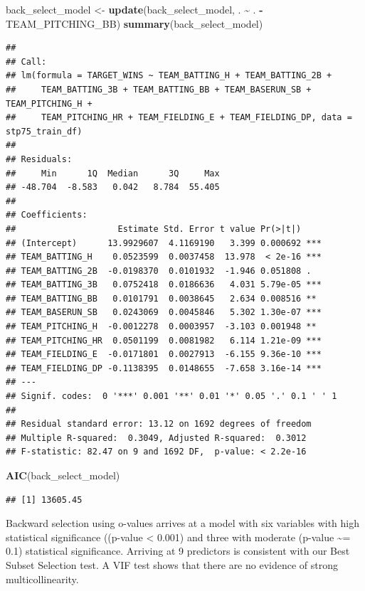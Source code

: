 \documentclass[
]{article}
\newenvironment{Shaded}{\begin{snugshade}}{\end{snugshade}}
\newcommand{\FunctionTok}[1]{\textcolor[rgb]{0.13,0.29,0.53}{\textbf{#1}}}
\newcommand{\NormalTok}[1]{#1}
\newcommand{\OtherTok}[1]{\textcolor[rgb]{0.56,0.35,0.01}{#1}}
\newcommand{\SpecialCharTok}[1]{\textcolor[rgb]{0.81,0.36,0.00}{\textbf{#1}}}
\begin{document}
\begin{Shaded}
\begin{Highlighting}[]
\NormalTok{back\_select\_model }\OtherTok{\textless{}{-}} \FunctionTok{update}\NormalTok{(back\_select\_model, . }\SpecialCharTok{\textasciitilde{}}\NormalTok{ . }\SpecialCharTok{{-}}\NormalTok{ TEAM\_PITCHING\_BB)}
\FunctionTok{summary}\NormalTok{(back\_select\_model)}
\end{Highlighting}
\end{Shaded}

\begin{verbatim}
## 
## Call:
## lm(formula = TARGET_WINS ~ TEAM_BATTING_H + TEAM_BATTING_2B + 
##     TEAM_BATTING_3B + TEAM_BATTING_BB + TEAM_BASERUN_SB + TEAM_PITCHING_H + 
##     TEAM_PITCHING_HR + TEAM_FIELDING_E + TEAM_FIELDING_DP, data = stp75_train_df)
## 
## Residuals:
##     Min      1Q  Median      3Q     Max 
## -48.704  -8.583   0.042   8.784  55.405 
## 
## Coefficients:
##                    Estimate Std. Error t value Pr(>|t|)    
## (Intercept)      13.9929607  4.1169190   3.399 0.000692 ***
## TEAM_BATTING_H    0.0523599  0.0037458  13.978  < 2e-16 ***
## TEAM_BATTING_2B  -0.0198370  0.0101932  -1.946 0.051808 .  
## TEAM_BATTING_3B   0.0752418  0.0186636   4.031 5.79e-05 ***
## TEAM_BATTING_BB   0.0101791  0.0038645   2.634 0.008516 ** 
## TEAM_BASERUN_SB   0.0243069  0.0045846   5.302 1.30e-07 ***
## TEAM_PITCHING_H  -0.0012278  0.0003957  -3.103 0.001948 ** 
## TEAM_PITCHING_HR  0.0501199  0.0081982   6.114 1.21e-09 ***
## TEAM_FIELDING_E  -0.0171801  0.0027913  -6.155 9.36e-10 ***
## TEAM_FIELDING_DP -0.1138395  0.0148655  -7.658 3.16e-14 ***
## ---
## Signif. codes:  0 '***' 0.001 '**' 0.01 '*' 0.05 '.' 0.1 ' ' 1
## 
## Residual standard error: 13.12 on 1692 degrees of freedom
## Multiple R-squared:  0.3049, Adjusted R-squared:  0.3012 
## F-statistic: 82.47 on 9 and 1692 DF,  p-value: < 2.2e-16
\end{verbatim}

\begin{Shaded}
\begin{Highlighting}[]
\FunctionTok{AIC}\NormalTok{(back\_select\_model)}
\end{Highlighting}
\end{Shaded}

\begin{verbatim}
## [1] 13605.45
\end{verbatim}

Backward selection using o-values arrives at a model with six variables
with high statistical significance ((p-value \textless{} 0.001) and
three with moderate (p-value \textasciitilde= 0.1) statistical
significance. Arriving at 9 predictors is consistent with our Best
Subset Selection test. A VIF test shows that there are no evidence of
strong multicollinearity.
\end{document}
